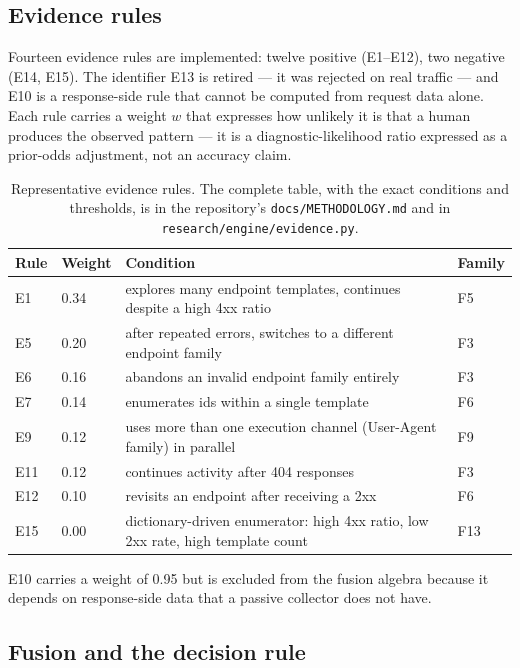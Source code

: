\documentclass[11pt]{article}
\begin{document}
\subsection{Evidence rules}
\label{sec:evidence}

Fourteen evidence rules are implemented: twelve positive (E1--E12), two negative (E14, E15).
The identifier E13 is retired --- it was rejected on real traffic --- and E10 is a
response-side rule that cannot be computed from request data alone. Each rule carries a
weight $w$ that expresses how unlikely it is that a human produces the observed pattern --- it
is a diagnostic-likelihood ratio expressed as a prior-odds adjustment, not an accuracy claim.

\begin{table}[t]
\centering
\caption{Representative evidence rules. The complete table, with the exact conditions and
thresholds, is in the repository's \texttt{docs/METHODOLOGY.md} and in
\texttt{research/engine/evidence.py}.}
\label{tab:rules}
\begin{tabularx}{\textwidth}{@{}L{0.06\textwidth}R{0.09\textwidth}Y L{0.08\textwidth}@{}}
\toprule
\textbf{Rule} & \textbf{Weight} & \textbf{Condition} & \textbf{Family} \\
\midrule
E1  & 0.34 & explores many endpoint templates, continues despite a high 4xx ratio & F5 \\
E5  & 0.20 & after repeated errors, switches to a different endpoint family & F3 \\
E6  & 0.16 & abandons an invalid endpoint family entirely & F3 \\
E7  & 0.14 & enumerates ids within a single template & F6 \\
E9  & 0.12 & uses more than one execution channel (User-Agent family) in parallel & F9 \\
E11 & 0.12 & continues activity after 404 responses & F3 \\
E12 & 0.10 & revisits an endpoint after receiving a 2xx & F6 \\
E15 & 0.00 & dictionary-driven enumerator: high 4xx ratio, low 2xx rate, high template count & F13 \\
\bottomrule
\end{tabularx}
\end{table}

E10 carries a weight of 0.95 but is excluded from the fusion algebra because it depends on
response-side data that a passive collector does not have.

\subsection{Fusion and the decision rule}
\label{sec:fusion}
\end{document}
